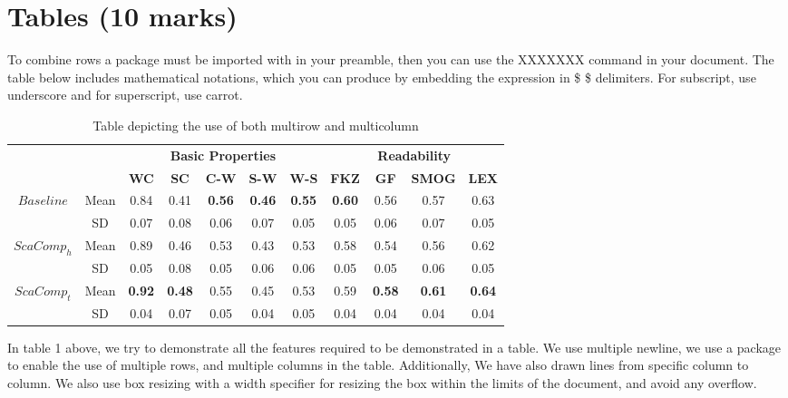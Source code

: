 \documentclass{article}
\begin{document}
\section{Tables (10 marks)}\large{
To combine rows a package must be imported with in your preamble, then you can use the XXXXXXX command in your document. The table below includes mathematical notations, which you can produce by embedding the expression in \$ \$ delimiters. For subscript, use underscore and for superscript, use carrot.}\\ \vspace*{0.5cm}
\begin{table}[ht]\centering
\begin{tabular}{|c|c|c|c|c|c|c|c|c|c|c|}\cline{3-11}
\multicolumn{2}{c}{}&\multicolumn{5}{|c|}{\bfseries Basic Properties}&\multicolumn{4}{|c|}{\bfseries Readability}\\
\cline{3-11}
\multicolumn{2}{c|}{}&{\textbf {WC}}&{\textbf {SC}}&{\textbf {C-W}}&{\textbf {S-W}}&{\textbf {W-S}}&{\textbf {FKZ}}&{\textbf {GF}}&{\textbf {SMOG}}&{\textbf {LEX}}\\
\hline
\multirow{2}{*}{\textit {$Baseline$}}&Mean&0.84&0.41&{\textbf {0.56}}&{\textbf {0.46}}&{\textbf {0.55}}&{\textbf {0.60}}&0.56&0.57&0.63\\
\cline{2-11}
&SD&0.07&0.08&0.06&0.07&0.05&0.05&0.06&0.07&0.05\\\hline\hline
\multirow{2}{*}{\textit{ $ScaComp_h$}}&Mean&0.89&0.46&0.53&0.43&0.53&0.58&0.54&0.56&0.62\\
\cline{2-11}
&SD&0.05&0.08&0.05&0.06&0.06&0.05&0.05&0.06&0.05\\
\hline\hline
\multirow{2}{*}{\textit{$ScaComp_t$}}&Mean&{\bfseries 0.92}& {\bfseries 0.48}&0.55&0.45&0.53&0.59&{\bfseries 0.58}&{\bfseries 0.61}&{\bfseries 0.64}\\
\cline{2-11}
&SD&0.04&0.07&0.05&0.04&0.05&0.04&0.04&0.04&0.04\\
\hline
\end{tabular}

\caption{\large{Table depicting the use of both multirow and multicolumn}}
\end{table}

{\LARGE{In table 1 above, we try to demonstrate all the features required to be demonstrated in a table. We use multiple newline, we use a package to enable the use of multiple rows, and multiple columns in the table. Additionally, We have also drawn lines from specific column to column. We also use box resizing with a width specifier for resizing the box within the limits of the document, and avoid any overflow.}}
\newpage
\hspace{-4mm} 
\newcommand\lipx{Unlike the quote environment, each paragraph is indented nor- mally.
It\textquotesingle s important to remark that even if you are typing quotes on English
there are different quotation marks used in English (UK) and English
(US).}
\end{document}
